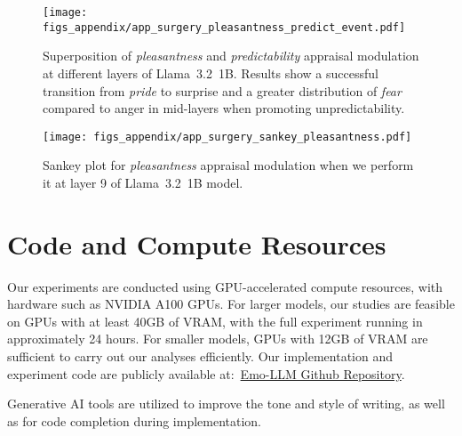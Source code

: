 \begin{figure*}[htbp]
    \centering
    \texttt{[image: figs\_appendix/app\_surgery\_pleasantness\_predict\_event.pdf]}
  \caption{Superposition of \textit{pleasantness} and \textit{predictability} appraisal modulation at different layers of Llama~3.2~1B. Results show a successful transition from \textit{pride} to surprise and a greater distribution of \textit{fear} compared to anger in mid-layers when promoting unpredictability.}
  \label{fig:appraisal_layers_pleasantness_predictability}
\end{figure*} 

\begin{figure*}[htbp]
    \centering
    \texttt{[image: figs\_appendix/app\_surgery\_sankey\_pleasantness.pdf]}
  \caption{Sankey plot for \textit{pleasantness} appraisal modulation when we perform it at layer 9 of Llama~3.2~1B model.}
  \label{fig:appraisal_sankey_pleasantness}
\end{figure*} 

\section{Code and Compute Resources}
Our experiments are conducted using GPU-accelerated compute resources, with hardware such as NVIDIA A100 GPUs. For larger models, our studies are feasible on GPUs with at least 40GB of VRAM, with the full experiment running in approximately 24 hours. For smaller models, GPUs with 12GB of VRAM are sufficient to carry out our analyses efficiently. Our implementation and experiment code are publicly available at:~\href{https://github.com/aminbana/emo-llm.git}{Emo-LLM Github Repository}.

Generative AI tools are utilized to improve the tone and style of writing, as well as for code completion during implementation.

